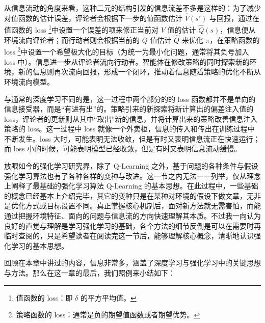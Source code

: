 从信息流动的角度来看，这种二元的结构引发的信息流差不多是这样的：为了减少对值函数的估计误差，评论者会根据下一步的值函数估计 $\hat V(s')$ 与回报，通过在值函数的 loss \footnote{值函数的 loss：即 $\delta$ 的平方平均值。}中设置一个误差的项来修正当前对 $V$ 值的估计 $\hat Q(s)$，信息便从环境流向评论者；而行动者则会根据当前的 $Q$ 值估计 $\hat Q$ 来优化 $\pi$，在策略函数的 loss \footnote{策略函数的 loss：通常是负的期望值函数或者期望优势。}中设置一个希望极大化的目标（为统一为最小化问题，通常将其负号加入 loss 中）。信息进一步从评论者流向行动者。智能体在修改策略的同时探索新的环境，新的信息则再次流向回报，形成一个闭环，推动着信息随着策略的优化不断从环境流向模型。

与通常的深度学习不同的是，这一过程中两个部分的的 loss 函数都并不是单向的信息接受器，而是“有进有出”的。策略引来的新探索将新计算出的偏差注入值的 loss，评论者的更新则从其中“取出”新的信息，并将计算出来的策略改善信息注入策略的 loss。这一过程中 loss 就像一个外卖柜，信息的传入和传出在训练过程中不断发生。loss 大时，可能表明无法收敛，但是有时又表明信息流正在快速运行；而 loss 小的时候，可能表明模型已经收敛，但是有时又表明信息流动缓慢。

放眼如今的强化学习研究界，除了 Q-Learning 之外，基于问题的各种条件与假设强化学习算法也有了各种各样的变种与改进。这一节之内无法一一列举，仅从理念上阐释了最基础的强化学习算法 Q-Learning 的基本思想。在此过程中，一些基础的概念已经基本上介绍完毕，其它的变种只是在某种对环境的假设下做文章，无非是优化方式或目标设置不同。真正掌握核心机制后，面对新方法就无需害怕，而能通过把握环境特征、面向的问题与信息流的方向快速理解其本质。不过我一向认为良好的直觉与理解是学习强化学习的基础，各个方法的细节反倒是可以在需要时再临时查阅的，只是希望读者在阅读完这一节后，能够理解核心概念，清晰地认识强化学习的基本思想。

回顾在本章中讲过的内容，信息非常多，涵盖了深度学习与强化学习中的关键思想与方法。那么在这一章的最后，我们照例来小结如下：

